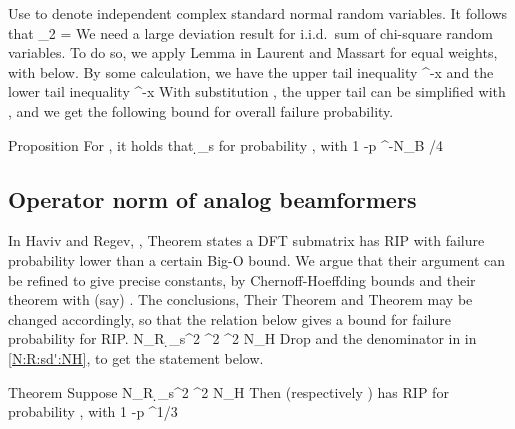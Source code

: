 Use  to denote independent complex standard normal random variables.
It follows that
%
 {
 _2
= 
}
%
We need a large deviation result for i.i.d.\ sum of chi-square random variables.
To do so, we apply Lemma  in Laurent and Massart \cite {LaM00} for equal weights, with  below.
By some calculation, we have the upper tail inequality
%
 {
 
\leq {} ^{-x} 
}
%
and the lower tail inequality
%
 {
 
\leq {} ^{-x} 
}
%
With substitution , the upper tail can be simplified with , and we get the following bound for overall failure probability.

\Result
{Proposition}
{
For , it holds that
%
 {
\geq \d_s 
}
for probability , with
 {
1 -p
  ^{-N_B  /4} 
}
}



\subsection {Operator norm of analog beamformers}

In Haviv and Regev,  \cite {KlM17}, Theorem  states a DFT submatrix has  RIP with failure probability lower than a certain Big-O bound.
We argue that their argument can be refined to give precise constants, by Chernoff-Hoeffding bounds and their theorem  with (say) .
The conclusions, 
Their Theorem  and Theorem  may be changed accordingly, so that the relation below gives a bound for failure probability for  RIP.
%
 {
N_R
\geq {} {\d_s^2} ^2 ^2 \log N_H 
}
%
Drop  and the denominator  in  in \eqref {N:R:sd':NH}, to get the statement below.

\Result
{Theorem}
{
Suppose
%
 {
N_R
\geq {} {\d_s^2} ^2 \log N_H 
}
%
Then  (respectively ) has  RIP for probability , with
 {
1 -p
\leq {} ^{1/3} 
}
}



